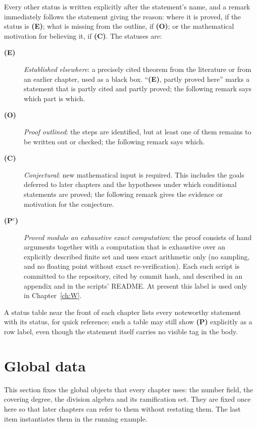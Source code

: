 Every other status is written explicitly after the statement's name,
and a remark immediately follows the statement giving the reason:
where it is proved, if the status is \textbf{(E)}; what is missing
from the outline, if \textbf{(O)}; or the mathematical motivation for
believing it, if \textbf{(C)}. The statuses are:
\begin{description}
\item[\textbf{(E)}] \emph{Established elsewhere}: a precisely cited
theorem from the literature or from an earlier chapter, used as a
black box. ``\textbf{(E)}, partly proved here'' marks a statement that
is partly cited and partly proved; the following remark says which
part is which.
\item[\textbf{(O)}] \emph{Proof outlined}: the steps are identified,
but at least one of them remains to be written out or checked; the
following remark says which.
\item[\textbf{(C)}] \emph{Conjectural}: new mathematical input is
required. This includes the goals deferred to later chapters and the
hypotheses under which conditional statements are proved; the
following remark gives the evidence or motivation for the
conjecture.
\item[\textbf{(P$^{\mathrm c}$)}] \emph{Proved modulo an exhaustive
exact computation}: the proof consists of hand arguments together
with a computation that is exhaustive over an explicitly described
finite set and uses exact arithmetic only (no sampling, and no
floating point without exact re-verification). Each such script is
committed to the repository, cited by commit hash, and described in
an appendix and in the scripts' README. At present this label is
used only in Chapter~\ref{ch:W}.
\end{description}
A status table near the front of each chapter lists every
noteworthy statement with its status, for quick reference; such a
table may still show \textbf{(P)} explicitly as a row label, even
though the statement itself carries no visible tag in the body.

\section{Global data}\label{gl:global}
This section fixes the global objects that every chapter uses: the number field, the covering degree, the division algebra and its ramification set. They are fixed once here so that later chapters can refer to them without restating them. The last item instantiates them in the running example.

